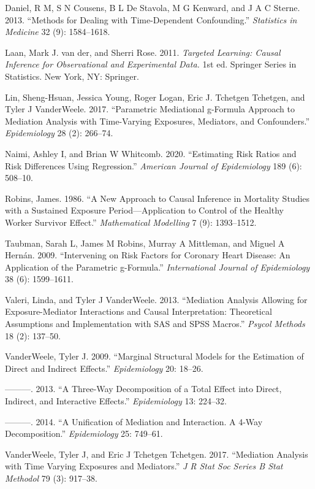 \documentclass[
]{book}
\newlength{\cslhangindent}
\newenvironment{CSLReferences}[2] %
 {\begin{list}{}{%
  \setlength{\itemindent}{0pt}
  \setlength{\leftmargin}{0pt}
  \setlength{\parsep}{0pt}
  \ifodd #1
   \setlength{\leftmargin}{\cslhangindent}
   \setlength{\itemindent}{-1\cslhangindent}
  \fi
  \setlength{\itemsep}{#2\baselineskip}}}
 {\end{list}}
\begin{document}
\label{refs}
\begin{CSLReferences}{1}{0}
Daniel, R M, S N Cousens, B L De Stavola, M G Kenward, and J A C Sterne. 2013. {``Methods for Dealing with Time-Dependent Confounding.''} \emph{Statistics in Medicine} 32 (9): 1584--1618.

Laan, Mark J. van der, and Sherri Rose. 2011. \emph{Targeted Learning: Causal Inference for Observational and Experimental Data.} 1st ed. Springer Series in Statistics. New York, NY: Springer.

Lin, Sheng-Hsuan, Jessica Young, Roger Logan, Eric J. Tchetgen Tchetgen, and Tyler J VanderWeele. 2017. {``Parametric Mediational g-Formula Approach to Mediation Analysis with Time-Varying Exposures, Mediators, and Confounders.''} \emph{Epidemiology} 28 (2): 266--74.

Naimi, Ashley I, and Brian W Whitcomb. 2020. {``Estimating Risk Ratios and Risk Differences Using Regression.''} \emph{American Journal of Epidemiology} 189 (6): 508--10.

Robins, James. 1986. {``A New Approach to Causal Inference in Mortality Studies with a Sustained Exposure Period---Application to Control of the Healthy Worker Survivor Effect.''} \emph{Mathematical Modelling} 7 (9): 1393--1512.

Taubman, Sarah L, James M Robins, Murray A Mittleman, and Miguel A Hernán. 2009. {``Intervening on Risk Factors for Coronary Heart Disease: An Application of the Parametric g-Formula.''} \emph{International Journal of Epidemiology} 38 (6): 1599--1611.

Valeri, Linda, and Tyler J VanderWeele. 2013. {``Mediation Analysis Allowing for Exposure-Mediator Interactions and Causal Interpretation: Theoretical Assumptions and Implementation with SAS and SPSS Macros.''} \emph{Psycol Methods} 18 (2): 137--50.

VanderWeele, Tyler J. 2009. {``Marginal Structural Models for the Estimation of Direct and Indirect Effects.''} \emph{Epidemiology} 20: 18--26.

---------. 2013. {``A Three-Way Decomposition of a Total Effect into Direct, Indirect, and Interactive Effects.''} \emph{Epidemiology} 13: 224--32.

---------. 2014. {``A Unification of Mediation and Interaction. A 4-Way Decomposition.''} \emph{Epidemiology} 25: 749--61.

VanderWeele, Tyler J, and Eric J Tchetgen Tchetgen. 2017. {``Mediation Analysis with Time Varying Exposures and Mediators.''} \emph{J R Stat Soc Series B Stat Methodol} 79 (3): 917--38.

\end{CSLReferences}
\end{document}
